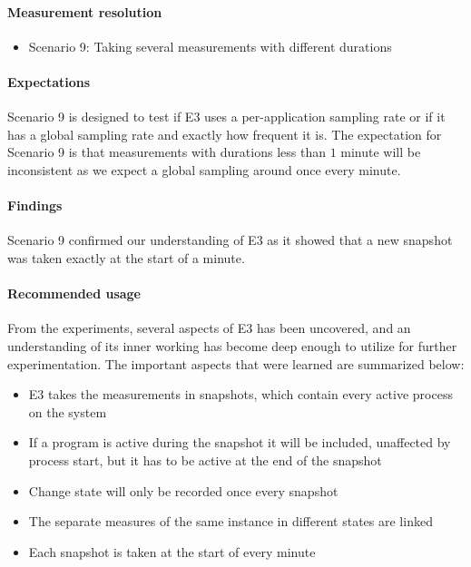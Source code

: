 \paragraph{Measurement resolution}

\begin{itemize}
    \item Scenario 9: Taking several measurements with different durations
\end{itemize}

\paragraph{Expectations}
Scenario 9 is designed to test if E3 uses a per-application sampling rate or if it has a global sampling rate and exactly how frequent it is. The expectation for Scenario 9 is that measurements with durations less than $1$ minute will be inconsistent as we expect a global sampling around once every minute.

\paragraph{Findings}
Scenario 9 confirmed our understanding of E3 as it showed that a new snapshot was taken exactly at the start of a minute.

\paragraph {Recommended usage}
From the experiments, several aspects of E3 has been uncovered, and an understanding of its inner working has become deep enough to utilize for further experimentation. The important aspects that were learned are summarized below:


\begin{itemize}
    \item E3 takes the measurements in snapshots, which contain every active process on the system
    \item If a program is active during the snapshot it will be included, unaffected by process start, but it has to be active at the end of the snapshot
    \item Change state will only be recorded once every snapshot
    \item The separate measures of the same instance in different states are linked
    \item Each snapshot is taken at the start of every minute
\end{itemize} 

